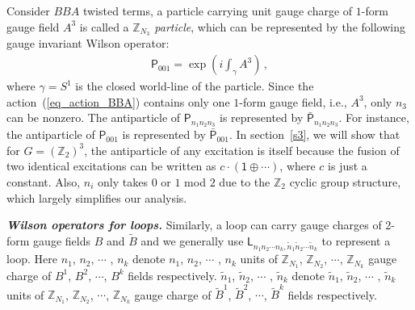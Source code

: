 \documentclass[11pt,nofootinbib,preprint]{revtex4-1}
\begin{document}
 Consider $BBA$ twisted terms, a particle carrying unit gauge charge of $1$-form gauge field $A^3$ is called a \textit{$\mathbb{Z} _{N_3}$ particle}, which can be represented by the following gauge invariant Wilson operator:
\begin{align}
	\mathsf{P}_{001}=\exp \left( i\int_{\gamma}{A^3} \right) \,,
\end{align}
where $\gamma=S^1$ is the closed world-line of the particle. Since  the action~(\ref{eq_action_BBA}) contains only one $1$-form gauge field, i.e., $A^3$, only $n_3$ can be nonzero. The antiparticle of $\mathsf{P}_{n_{1}n_{2}n_{3}}$ is represented by $\bar{\mathsf{P}}_{n_{1}n_{2}n_{3}}$. For instance, the antiparticle of $\mathsf{P}_{001}$ is represented by $\bar{\mathsf{P}}_{001}$. 
In section~\ref{s3}, we will show that for $G=\left(\mathbb{Z} _{2}\right)^{3}$, the antiparticle of any excitation is itself because the fusion of two identical excitations can be written as $c\cdot\left(\mathsf{1}\oplus\cdots\right)$, where $c$ is just a constant. Also, $n_{i}$ only takes $0$ or $1$ mod $2$ due to the $\mathbb{Z} _{2}$ cyclic group structure, which largely simplifies our analysis.

\textbf{\textit{Wilson operators for loops.}}
Similarly, a loop can carry gauge charges of 2-form gauge fields $B$ and $\tilde{B}$ and we generally use $\mathsf{L}_{n_{1}n_{2}\cdots n_{k},\tilde{n}_{1}\tilde{n}_{2}\cdots\tilde{n}_{k}}$ to represent a loop. Here $n_{1}$, $n_{2}$, $\cdots$ , $n_{k}$ denote $n_{1}$, $n_{2}$, $\cdots$ , $n_{k}$ units of $\mathbb{Z} _{N_1}$, $\mathbb{Z} _{N_2}$, $\cdots$, $\mathbb{Z} _{N_k}$ gauge charge of $B^1$, $B^2$, $\cdots$, $B^k$ fields respectively. $\tilde{n}_{1}$, $\tilde{n}_{2}$, $\cdots$ , $\tilde{n}_{k}$ denote $\tilde{n}_{1}$, $\tilde{n}_{2}$, $\cdots$ , $\tilde{n}_{k}$ units of $\mathbb{Z} _{N_1}$, $\mathbb{Z} _{N_2}$, $\cdots$, $\mathbb{Z} _{N_k}$ gauge charge of $\tilde{B}^1$, $\tilde{B}^2$, $\cdots$, $\tilde{B}^k$ fields respectively. 
\end{document}
